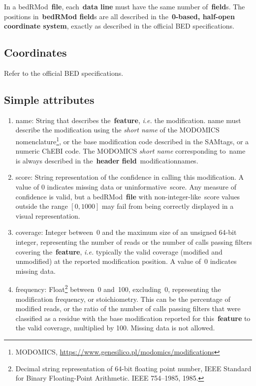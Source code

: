 \documentclass[11pt]{article}
\begin{document}
In a \ac{bedRMod}~\textbf{file}, each~\textbf{data line} must have the same number of~\textbf{field}s.
The positions in~\textbf{\acs{bedRMod} field}s are all described in the~\textbf{0-based, half-open coordinate system}, exactly as 
described in the official \ac{BED} specifications.

\subsection{Coordinates}
Refer to the official \ac{BED} specifications.

\subsection{Simple attributes}
\begin{enumerate}
\item \textsf{name}: String that describes the~\textbf{feature}, \textit{i.e.} the modification. \textsf{name} must describe 
the modification using the \emph{short name} of the MODOMICS nomenclature\footnote{MODOMICS, \url{https://www.genesilico.pl/modomics/modifications}}, or the base modification code described in the SAMtags, or a numeric ChEBI code. The MODOMICS \emph{short name} corresponding to~\textsf{name} is always described in the~\textbf{header field}~\textsf{modification\textunderscore names}.

\item \textsf{score}: String representation of the confidence in calling this modification. A value of 0 indicates missing data or uninformative~\textsf{score}. Any measure of confidence is valid, but a \ac{bedRMod}~\textbf{file} with non-integer-like~\textsf{score} values outside the range $[0, 1000]$ may fail from being correctly displayed in a visual representation.

\item \textsf{coverage}: Integer between~0 and the maximum size of an unsigned 64-bit integer, representing the number of reads or the number of calls passing filters covering the~\textbf{feature}, \textit{i.e.} typically the valid coverage (modified and unmodified) at the reported modification position. A value of~0 indicates missing data.

\item \textsf{frequency}: Float\footnote{Decimal string representation of 64-bit floating point number, IEEE Standard for Binary Floating-Point Arithmetic. IEEE 754–1985, 1985.} between~0 and~100, excluding~0, representing the modification frequency, or stoichiometry. This can be the percentage of modified reads, or the ratio of the number of calls passing filters that were classified as a residue with the base modification reported for this~\textbf{feature} to the valid coverage, multiplied by 100. Missing data is not allowed.
\end{enumerate}
\end{document}
